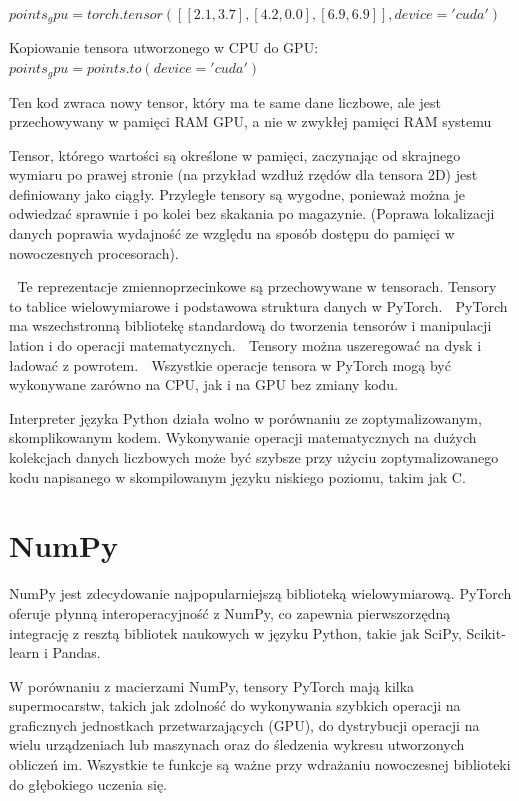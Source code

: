 \documentclass[brudnopis]{xmgr}
\begin{document}
$points_gpu = torch.tensor([[2.1, 3.7], [4.2, 0.0], [6.9, 6.9]], device='cuda')$

Kopiowanie tensora utworzonego w CPU do GPU:
$points_gpu = points.to(device='cuda')$

Ten kod zwraca nowy tensor, który ma te same dane liczbowe, ale jest przechowywany w pamięci RAM GPU, a nie w zwykłej pamięci RAM systemu

Tensor, którego wartości są określone w pamięci, zaczynając od skrajnego wymiaru po prawej stronie (na przykład wzdłuż rzędów dla tensora 2D) jest definiowany jako ciągły. Przyległe tensory są wygodne, ponieważ można je odwiedzać sprawnie i po kolei bez skakania po magazynie. (Poprawa lokalizacji danych poprawia wydajność ze względu na sposób dostępu do pamięci w nowoczesnych procesorach).

􏰹 Te reprezentacje zmiennoprzecinkowe są przechowywane w tensorach.
Tensory to tablice wielowymiarowe i podstawowa struktura danych w PyTorch.
􏰹 PyTorch ma wszechstronną bibliotekę standardową do tworzenia tensorów i manipulacji
lation i do operacji matematycznych.
􏰹 Tensory można uszeregować na dysk i ładować z powrotem.
􏰹 Wszystkie operacje tensora w PyTorch mogą być wykonywane zarówno na CPU, jak i na GPU
bez zmiany kodu.

Interpreter języka Python działa wolno w porównaniu ze zoptymalizowanym, skomplikowanym kodem. Wykonywanie operacji matematycznych na dużych kolekcjach danych liczbowych może być szybsze przy użyciu zoptymalizowanego kodu napisanego w skompilowanym języku niskiego poziomu, takim jak C.

    \section{NumPy\label{s:dsssl}}
    
    NumPy jest zdecydowanie najpopularniejszą biblioteką wielowymiarową. PyTorch oferuje płynną interoperacyjność z NumPy, co zapewnia pierwszorzędną integrację z resztą bibliotek naukowych w języku Python, takie jak SciPy, Scikit-learn i Pandas.

W porównaniu z macierzami NumPy, tensory PyTorch mają kilka supermocarstw, takich jak zdolność do wykonywania szybkich operacji na graficznych jednostkach przetwarzających (GPU), do dystrybucji operacji na wielu urządzeniach lub maszynach oraz do śledzenia wykresu utworzonych obliczeń im. Wszystkie te funkcje są ważne przy wdrażaniu nowoczesnej biblioteki do głębokiego uczenia się.
\end{document}
